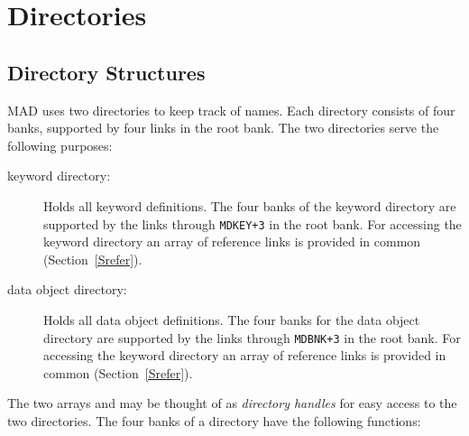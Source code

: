 \section{Directories}
\label{Sdir}

\subsection{Directory Structures}
MAD uses two directories to keep track of names.
Each directory consists of four banks, supported by four links
in the root bank.
The two directories serve the following purposes:
\begin{description}
\item[keyword directory:]
Holds all keyword definitions.
The four banks of the keyword directory are supported
by the links  through {\tt MDKEY+3} in the root bank.
For accessing the keyword directory an array of reference links
 is provided in common 
(Section~\ref{Srefer}).
\item[data object directory:]
Holds all data object definitions.
The four banks for the data object directory are supported
by the links  through {\tt MDBNK+3} in the root bank.
For accessing the keyword directory an array of reference links
 is provided in common 
(Section~\ref{Srefer}).
\end{description}
 
The two arrays  and  may be thought of as
{\em directory handles} for easy access to the
two directories.
The four banks of a directory have the following functions:
 
